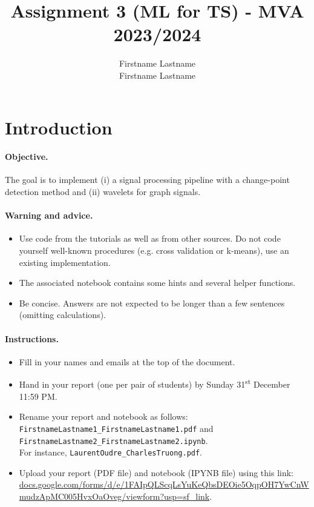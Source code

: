 \documentclass[11pt]{article}
\title{Assignment 3 (ML for TS) - MVA 2023/2024}
\author{
Firstname Lastname \email{sahbi.hanafi@student-cs.fr} \\ %
Firstname Lastname \email{wadi.moughanim@mail.com} %
}
\begin{document}
\maketitle

\section{Introduction}

\paragraph{Objective.} The goal is to implement (i) a signal processing pipeline with a change-point detection method and (ii) wavelets for graph signals.

\paragraph{Warning and advice.} 
\begin{itemize}
    \item Use code from the tutorials as well as from other sources. Do not code yourself well-known procedures (e.g. cross validation or k-means), use an existing implementation.
    \item The associated notebook contains some hints and several helper functions.
    \item Be concise. Answers are not expected to be longer than a few sentences (omitting calculations).
\end{itemize}



\paragraph{Instructions.}
\begin{itemize}
    \item Fill in your names and emails at the top of the document.
    \item Hand in your report (one per pair of students) by Sunday 31\textsuperscript{st} December 11:59 PM.
    \item Rename your report and notebook as follows:\\ \texttt{FirstnameLastname1\_FirstnameLastname1.pdf} and\\ \texttt{FirstnameLastname2\_FirstnameLastname2.ipynb}.\\
    For instance, \texttt{LaurentOudre\_CharlesTruong.pdf}.
    \item Upload your report (PDF file) and notebook (IPYNB file) using this link: \href{https://docs.google.com/forms/d/e/1FAIpQLScqLsYuKeQbsDEOie5OqpOH7YwCnWmudzApMC005HvxOaOveg/viewform?usp=sf_link}{docs.google.com/forms/d/e/1FAIpQLScqLsYuKeQbsDEOie5OqpOH7YwCnWmudzApMC005HvxOaOveg/viewform?usp=sf\_link}.
\end{itemize}
\end{document}
